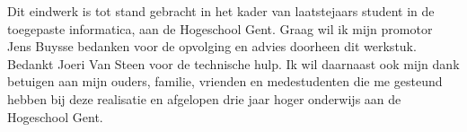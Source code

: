 \label{ch:voorwoord}

Dit eindwerk is tot stand gebracht in het kader van laatstejaars student in de toegepaste informatica, aan de Hogeschool Gent.
\newline\newline
Graag wil ik mijn promotor Jens Buysse bedanken voor de opvolging en advies doorheen dit werkstuk. Bedankt Joeri Van Steen voor de technische hulp. 
\newline\newline
Ik wil daarnaast ook mijn dank betuigen aan mijn ouders, familie, vrienden en medestudenten die me gesteund hebben bij deze realisatie en afgelopen drie jaar hoger onderwijs aan de Hogeschool Gent.